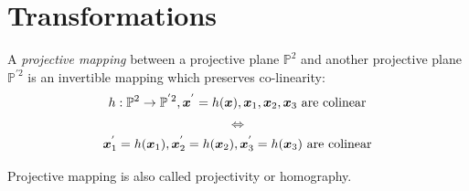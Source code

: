 \documentclass[12pt, a4paper]{report}
\begin{document}
    \newpage
    \section{Transformations}
    \begin{definition}
        A \emph{projective mapping} between a projective plane $\mathbb{P}^2$ and another projective plane $\mathbb{P}^{'2}$ is an invertible mapping which preserves co-linearity:
        \[h:\mathbb{P}^2 \rightarrow \mathbb{P}^{'2}, \boldsymbol{x}^{'}=h(\boldsymbol{x}),\boldsymbol{x}_1,\boldsymbol{x}_2,\boldsymbol{x}_3 \textnormal{ are colinear}\]
        \[\Leftrightarrow\]
        \[\boldsymbol{x}_1^{'}=h(\boldsymbol{x}_1),\boldsymbol{x}_2^{'}=h(\boldsymbol{x}_2),\boldsymbol{x}_3^{'}=h(\boldsymbol{x}_3) \textnormal{ are colinear}\]
    \end{definition}
    Projective mapping is also called projectivity or homography. 
\end{document}
